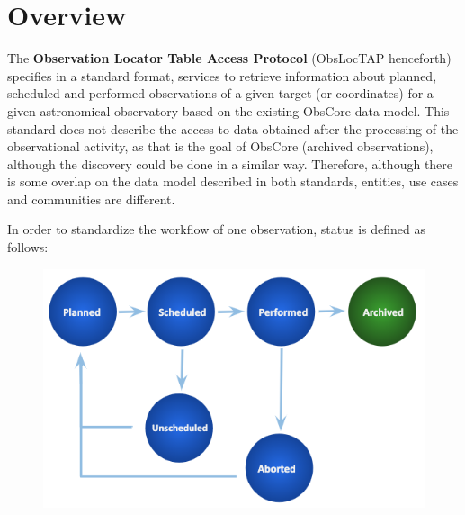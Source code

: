 \documentclass[11pt,a4paper]{ivoa}
\begin{document}
\pagebreak


\section{Overview}
The \textbf{Observation Locator Table Access Protocol} (ObsLocTAP henceforth)
specifies in a standard format, services to retrieve information about planned,
scheduled and performed observations of a given target (or coordinates) for a
given astronomical observatory based on the existing ObsCore data model. This
standard does not describe the access to data obtained after the processing of
the observational activity, as that is the goal of ObsCore (archived
observations), although the discovery could be done in a similar way.
Therefore, although there is some overlap on the data model described in both
standards, entities, use cases and communities are different.

In order to standardize the workflow of one observation, status is defined as
follows:

\begin{figure}[H]
\advance\leftskip 0.0in		\hfill\includegraphics[width=5.0in]
{./media/observations_workflow.png}\hfill\strut%
\end{figure}
\end{document}
